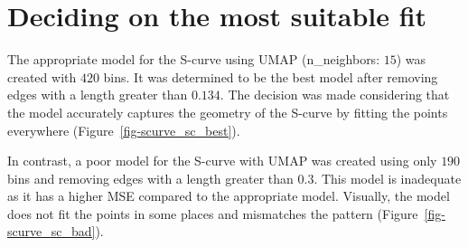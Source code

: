 \documentclass[
  12pt]{article}
\begin{document}
\section{Deciding on the most suitable
fit}\label{deciding-on-the-most-suitable-fit}

The appropriate model for the S-curve using UMAP (n\_neighbors: \(15\))
was created with \(420\) bins. It was determined to be the best model
after removing edges with a length greater than \(0.134\). The decision
was made considering that the model accurately captures the geometry of
the S-curve by fitting the points everywhere
(Figure~\ref{fig-scurve_sc_best}).

In contrast, a poor model for the S-curve with UMAP was created using
only \(190\) bins and removing edges with a length greater than \(0.3\).
This model is inadequate as it has a higher MSE compared to the
appropriate model. Visually, the model does not fit the points in some
places and mismatches the pattern (Figure~\ref{fig-scurve_sc_bad}).
\end{document}
